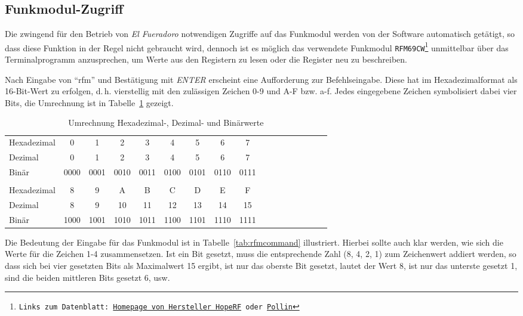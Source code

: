 \documentclass[pdftex, parskip, numbers=noenddot, toc=listof]{scrbook}
\newcommand{\anlage}{\emph{El Fueradoro}}
\begin{document}
	\subsection{Funkmodul-Zugriff}
	\label{sec:rfmzugriff}

	Die zwingend für den Betrieb von {\anlage} notwendigen Zugriffe auf das Funkmodul werden von der Software automatisch getätigt, so dass diese Funktion in der Regel nicht gebraucht wird, dennoch ist es möglich das verwendete Funkmodul \texttt{RFM69CW\footnote{Links zum Datenblatt: \href{http://www.hoperf.com/upload/rf/RFM69CW-V1.1.pdf}{Homepage von Hersteller HopeRF} oder \href{http://www.pollin.de/shop/downloads/D810303D.PDF}{Pollin}}} unmittelbar über das Terminalprogramm anzusprechen, um Werte aus den Registern zu lesen oder die Register neu zu beschreiben.

	Nach Eingabe von \enquote{rfm} und Bestätigung mit \emph{ENTER} erscheint eine Aufforderung zur Befehlseingabe. Diese hat im Hexadezimalformat als 16-Bit-Wert zu erfolgen, d.\,h. vierstellig mit den zulässigen Zeichen 0-9 und A-F bzw. a-f. Jedes eingegebene Zeichen symbolisiert dabei vier Bits, die Umrechnung ist in Tabelle~\ref{tab:zahlensysteme} gezeigt.

	\begin{table}[t]
		\begin{center}
			\begin{tabularx}{.8\textwidth}{X*{16}c}
				\hline
				Hexadezimal & 0    & 1    & 2    & 3    & 4    & 5    & 6    & 7    \\
				Dezimal     & 0    & 1    & 2    & 3    & 4    & 5    & 6    & 7    \\
				Binär      & 0000 & 0001 & 0010 & 0011 & 0100 & 0101 & 0110 & 0111 \\
				\\
				Hexadezimal & 8    & 9    & A    & B    & C    & D    & E    & F    \\
				Dezimal     & 8    & 9    & 10   & 11   & 12   & 13   & 14   & 15   \\
				Binär      & 1000 & 1001 & 1010 & 1011 & 1100 & 1101 & 1110 & 1111 \\ \hline
			\end{tabularx}
		\end{center}
		\caption{Umrechnung Hexadezimal-, Dezimal- und Binärwerte}
		\label{tab:zahlensysteme}
	\end{table}

	Die Bedeutung der Eingabe für das Funkmodul ist in Tabelle~\ref{tab:rfmcommand} illustriert. Hierbei sollte auch klar werden, wie sich die Werte für die Zeichen 1-4 zusammensetzen. Ist ein Bit gesetzt, muss die entsprechende Zahl (8, 4, 2, 1) zum Zeichenwert addiert werden, so dass sich bei vier gesetzten Bits als Maximalwert 15 ergibt, ist nur das oberste Bit gesetzt, lautet der Wert 8, ist nur das unterste gesetzt 1, sind die beiden mittleren Bits gesetzt 6, usw.
\end{document}
